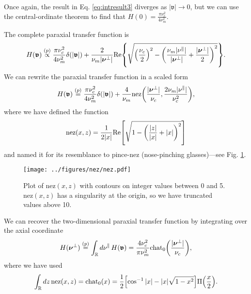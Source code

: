 \documentclass[]{osa-article}
\let\originalleft\left
\let\originalright\right
\renewcommand{\left}{\mathopen{}\mathclose\bgroup\originalleft}
\renewcommand{\right}{\aftergroup\egroup\originalright}
\providecommand{\mbb}[1]{\mathbb{#1}}
\providecommand{\bs}[1]{\boldsymbol{#1}}
\providecommand{\bv}{\boldsymbol{\mathfrak{v}}}
\providecommand{\bvperp}{\bs{\nu}^{\bot}}
\providecommand{\bvpar}{\nu^{\parallel}}
\providecommand{\eqp}{\stackrel{(p)}{=}}
\providecommand{\propp}{\stackrel{(p)}{\propto}}
\begin{document}
Once again, the result in Eq. \eqref{eq:intresult3} diverges as $|\bv| \rightarrow 0$, but we can use the central-ordinate theorem to find that $H(0) = \frac{\pi\nu_c^2}{4\nu_m^2}$. 

The complete paraxial transfer function is 
\begin{align}
  H(\bv) \propp \frac{\pi\nu_c^2}{4\nu_m^2}\delta(|\bv|) + \frac{2}{\nu_m|\bvperp|}\text{Re}\left\{\sqrt{\left(\frac{\nu_c}{2}\right)^2 - \left(\frac{\nu_m|\bvpar|}{|\bvperp|} + \frac{|\bvperp|}{2}\right)^2}\right\}.
\end{align}
We can rewrite the paraxial transfer function in a scaled form 
\begin{align}
  H(\bv) \eqp \frac{\pi\nu_c^2}{4\nu_m^2}\delta(|\bv|) + \frac{4}{\nu_m}\text{nez}\left(\frac{|\bvperp|}{\nu_c}, \frac{2\nu_m|\bvpar|}{\nu_c^2}\right),
\end{align}
where we have defined the function
\begin{align}
 \text{nez}(x, z) = \frac{1}{2|x|}\text{Re}\left[\sqrt{1 - \left(\frac{|z|}{|x|} + |x|\right)^2}\right]
\end{align}
and named it for its resemblance to pince-nez (nose-pinching glasses)---see Fig. \ref{fig:nez}.
\begin{figure}
  \centering
  \texttt{[image: ../figures/nez/nez.pdf]}
  \caption{Plot of $\text{nez}(x,z)$ with contours on integer values between 0 and 5. $\text{nez}(x,z)$ has a singularity at the origin, so we have truncated values above 10.}
  \label{fig:nez}
\end{figure}

We can recover the two-dimensional paraxial transfer function by integrating over the axial coordinate
\begin{align}
  H(\bvperp) \eqp \int_{\mbb{R}}d\bvpar\, H(\bv) = \frac{4\nu_c^2}{\pi\nu_m^2}\text{chat}_0\left(\frac{|\bvperp|}{\nu_c}\right), 
\end{align}
where we have used
\begin{align}
  \int_{\mbb{R}}dz\,\text{nez}(x,z) = \text{chat}_0(x) = \frac{1}{2}\left[\cos^{-1}|x| - |x|\sqrt{1-x^2}\right]\Pi\left(\frac{x}{2}\right).
\end{align}
\end{document}
